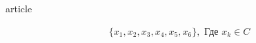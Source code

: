 article

\usepackage[utf8]{inputenc}
\usepackage[T2A]{fontenc}
\usepackage[russian]{babel}


\begin{align*}
\{x_1, x_2, x_3, x_4, x_5, x_6\}, \text{ Где } x_k \in C
\end{align*}
